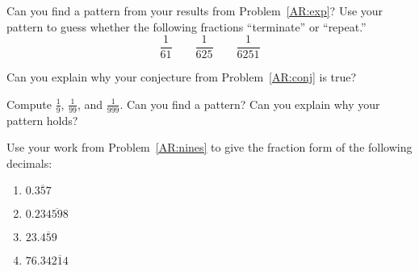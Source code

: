 \begin{prob}\label{AR:conj}
Can you find a pattern from your results from Problem~\ref{AR:exp}?
Use your pattern to guess whether the following fractions
``terminate'' or ``repeat.''
\[
\dfrac{1}{61}\qquad \dfrac{1}{625} \qquad \dfrac{1}{6251}
\]
\end{prob}


\begin{prob}
Can you explain why your conjecture from Problem~\ref{AR:conj} is
true?
\end{prob}


\begin{prob}\label{AR:nines} 
Compute $\frac{1}{9}$, $\frac{1}{99}$, and $\frac{1}{999}$. Can you
find a pattern? Can you explain why your pattern holds?
\end{prob}


\begin{prob}
Use your work from Problem~\ref{AR:nines} to give the fraction form of
the following decimals:
\begin{enumerate}
\item $0.\overline{357}$
\item $0.23\overline{4598}$
\item $23.\overline{459}$
\item $76.34\overline{214}$
\end{enumerate}
\end{prob}

